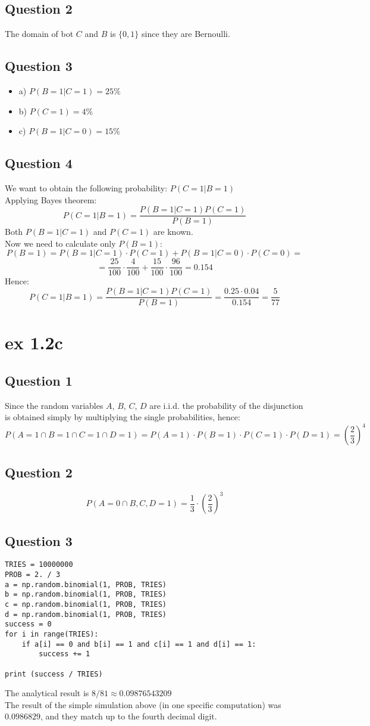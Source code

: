 \subsection{Question 2}
The domain of bot $C$ and $B$ is $\{0, 1\}$ since they are Bernoulli.
\subsection{Question 3}
\begin{itemize}
	\item a) $ P( B=1 | C=1 ) = 25\% $
	\item b) $ P( C=1 ) = 4\% $
	\item c) $ P( B=1 | C=0 ) = 15\% $
\end{itemize}
\subsection{Question 4}
We want to obtain the following probability: $ P( C=1 | B=1 ) $ \\
Applying Bayes theorem:
$$
	P( C=1 | B=1 ) = \frac{P( B=1 | C=1 ) P( C=1 )}{P( B=1 )}
$$
Both $ P( B=1 | C=1 ) $ and $ P( C=1 ) $ are known. \\
Now we need to calculate only $P(B=1)$:
$$
	P(B=1) = P( B=1 | C=1 ) \cdot P( C=1 ) + P( B=1 | C=0 ) \cdot P( C=0 ) =
$$
$$
	= \frac{25}{100} \cdot \frac{4}{100} + \frac{15}{100} \cdot \frac{96}{100} = 0.154
$$
Hence:
$$
	P( C=1 | B=1 ) = \frac{P( B=1 | C=1 ) P( C=1 )}{P( B=1 )} = \frac{0.25 \cdot 0.04}{0.154} = \frac{5}{77}
$$


\section{ex 1.2c}
	
\subsection{Question 1}
Since the random variables $A$, $B$, $C$, $D$ are i.i.d. the probability of the disjunction is obtained simply by multiplying the single probabilities, hence:
$$
	P(A=1 \cap B=1 \cap C=1 \cap D=1) = P(A=1) \cdot P(B=1) \cdot P(C=1) \cdot P(D=1) = (\frac{2}{3})^4
$$

\subsection{Question 2}
$$
	P(A=0 \cap B,C,D = 1) = \frac{1}{3} \cdot (\frac{2}{3})^3
$$
\subsection{Question 3}
\begin{lstlisting}
TRIES = 10000000
PROB = 2. / 3
a = np.random.binomial(1, PROB, TRIES)
b = np.random.binomial(1, PROB, TRIES)
c = np.random.binomial(1, PROB, TRIES)
d = np.random.binomial(1, PROB, TRIES)
success = 0
for i in range(TRIES):
    if a[i] == 0 and b[i] == 1 and c[i] == 1 and d[i] == 1:
        success += 1

print (success / TRIES)
\end{lstlisting}

The analytical result is $8/81 \approx 0.09876543209$\\
The result of the simple simulation above (in one specific computation) was $0.0986829$, and they match up to the fourth decimal digit.